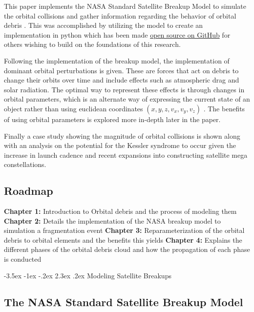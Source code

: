 \documentclass[a4paper, 12pt]{article}
\makeatletter
\renewcommand\section{\clearpage\newpage\@startsection {section}{1}{\z@}%
	{-3.5ex \@plus -1ex \@minus -.2ex}%
	{2.3ex \@plus.2ex}%
	{\normalfont\Large\bfseries}}
\makeatother
\begin{document}
This paper implements the NASA Standard Satellite Breakup Model to simulate the orbital collisions and gather information regarding the behavior of orbital debris \citep{johnson_nasas_2001}. This was accomplished by utilizing the model to create an implementation in python which has been made \href{https://github.com/ReeceHumphreys/OrbitalDebris}{open source on GitHub} for others wishing to build on the foundations of this research.

Following the implementation of the breakup model, the implementation of dominant orbital perturbations is given. These are forces that act on debris to change their orbits over time and include effects such as atmospheric drag and solar radiation. The optimal way to represent these effects is through changes in orbital parameters, which is an alternate way of expressing the current state of an object rather than using euclidean coordinates $(x,y,z, v_x, v_y, v_z)$ . The benefits of using orbital parameters is explored more in-depth later in the paper.

Finally a case study showing the magnitude of orbital collisions is shown along with an analysis on the potential for the Kessler syndrome to occur given the increase in launch cadence and recent expansions into constructing satellite mega constellations.

\subsection{Roadmap}
\textbf{Chapter 1:}  Introduction to Orbital debris and the process of modeling them \newline 
\textbf{Chapter 2:} Details the implementation of the NASA breakup model to simulation a fragmentation event \newline 
\textbf{Chapter 3:} Reparameterization of the orbital debris to orbital elements and the benefits this yields  \newline 
\textbf{Chapter 4:} Explains the different phases of the orbital debris cloud and how the propagation of each phase is conducted  \newline 
\singlespace

\section{Modeling Satellite Breakups}
\label{Modeling Satellite Breakups}
\doublespace


\subsection{The NASA Standard Satellite Breakup Model}
\end{document}

